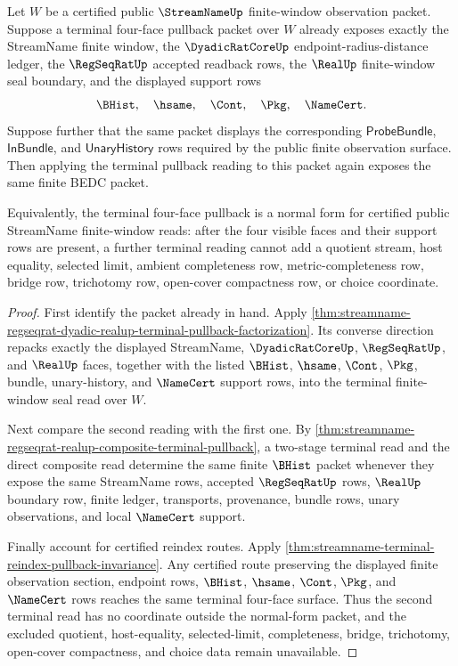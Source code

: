 \begin{theorem}
\label{thm:streamname-terminal-pullback-idempotence}
Let $W$ be a certified public $\StreamNameUp$ finite-window observation
packet. Suppose a terminal four-face pullback packet over $W$ already exposes
exactly the StreamName finite window, the $\DyadicRatCoreUp$
endpoint-radius-distance ledger, the $\RegSeqRatUp$ accepted readback rows,
the $\RealUp$ finite-window seal boundary, and the displayed support rows
$$
\BHist,\quad \hsame,\quad \Cont,\quad \Pkg,\quad \NameCert.
$$
Suppose further that the same packet displays the corresponding
$\mathsf{ProbeBundle}$, $\mathsf{InBundle}$, and
$\mathsf{UnaryHistory}$ rows required by the public finite observation
surface. Then applying the terminal pullback reading to this packet again
exposes the same finite BEDC packet.

Equivalently, the terminal four-face pullback is a normal form for certified
public StreamName finite-window reads: after the four visible faces and their
support rows are present, a further terminal reading cannot add a quotient
stream, host equality, selected limit, ambient completeness row,
metric-completeness row, bridge row, trichotomy row, open-cover compactness
row, or choice coordinate.
\end{theorem}
\begin{proof}
First identify the packet already in hand. Apply
\autoref{thm:streamname-regseqrat-dyadic-realup-terminal-pullback-factorization}.
Its converse direction repacks exactly the displayed StreamName,
$\DyadicRatCoreUp$, $\RegSeqRatUp$, and $\RealUp$ faces, together with the
listed $\BHist$, $\hsame$, $\Cont$, $\Pkg$, bundle, unary-history, and
$\NameCert$ support rows, into the terminal finite-window seal read over $W$.

Next compare the second reading with the first one. By
\autoref{thm:streamname-regseqrat-realup-composite-terminal-pullback}, a
two-stage terminal read and the direct composite read determine the same
finite $\BHist$ packet whenever they expose the same StreamName rows,
accepted $\RegSeqRatUp$ rows, $\RealUp$ boundary row, finite ledger,
transports, provenance, bundle rows, unary observations, and local
$\NameCert$ support.

Finally account for certified reindex routes. Apply
\autoref{thm:streamname-terminal-reindex-pullback-invariance}. Any certified
route preserving the displayed finite observation section, endpoint rows,
$\BHist$, $\hsame$, $\Cont$, $\Pkg$, and $\NameCert$ rows reaches the same
terminal four-face surface. Thus the second terminal read has no coordinate
outside the normal-form packet, and the excluded quotient, host-equality,
selected-limit, completeness, bridge, trichotomy, open-cover compactness, and
choice data remain unavailable.
\end{proof}

